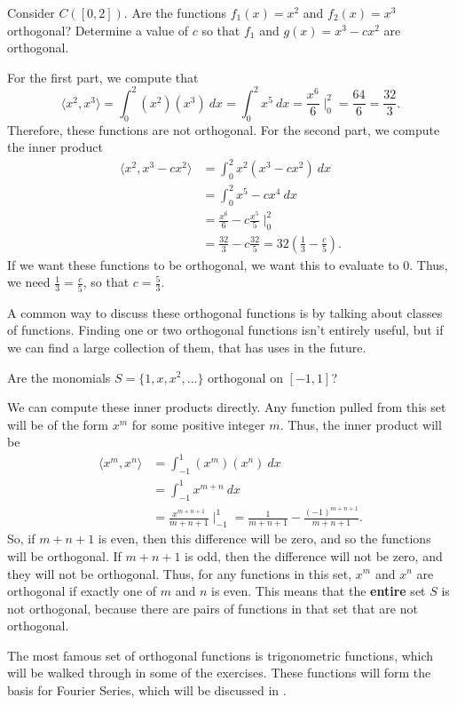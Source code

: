 \documentclass{ximera}
\begin{document}
\begin{example}
    Consider $C([0,2])$. Are the functions $f_1(x) = x^2$ and $f_2(x) = x^3$ orthogonal? Determine a value of $c$ so that $f_1$ and $g(x) = x^3 - cx^2$ are orthogonal.
\end{example}

\begin{exampleSol}
    For the first part, we compute that
    \[ 
        \langle x^2, x^3 \rangle = \int_0^2 (x^2)(x^3)\ dx = \int_0^2 x^5\ dx = \frac{x^6}{6}\mid_0^2 = \frac{64}{6} = \frac{32}{3}. 
    \] 
    Therefore, these functions are not orthogonal. For the second part, we compute the inner product
    \[ 
        \begin{split}
            \langle x^2, x^3 - cx^2 \rangle &= \int_0^2 x^2(x^3 - cx^2)\ dx \\
            &= \int_0^2 x^5 - cx^4\ dx \\
            &= \frac{x^6}{6} - c\frac{x^5}{5} \mid_0^2 \\
            &= \frac{32}{3} - c\frac{32}{5} = 32\left(\frac{1}{3} - \frac{c}{5} \right).
        \end{split} 
    \]
    If we want these functions to be orthogonal, we want this to evaluate to $0$. Thus, we need $\frac{1}{3} = \frac{c}{5}$, so that $c = \frac{5}{3}$. 
\end{exampleSol}

A common way to discuss these orthogonal functions is by talking about classes of functions. Finding one or two orthogonal functions isn't entirely useful, but if we can find a large collection of them, that has uses in the future.

\begin{example}
    Are the monomials $S = \{1, x, x^2, ...\}$ orthogonal on $[-1,1]$?
\end{example}

\begin{exampleSol}
    We can compute these inner products directly. Any function pulled from this set will be of the form $x^m$ for some positive integer $m$. Thus, the inner product will be
    \[ 
        \begin{split}
            \langle x^m, x^n \rangle &= \int_{-1}^1 (x^m)(x^n)\ dx \\
            &= \int_{-1}^1 x^{m+n}\ dx \\
            &= \frac{x^{m+n+1}}{m+n+1}\mid_{-1}^1 = \frac{1}{m+n+1} - \frac{(-1)^{m+n+1}}{m+n+1}.
        \end{split} 
    \]
    So, if $m+n+1$ is even, then this difference will be zero, and so the functions will be orthogonal. If $m+n+1$ is odd, then the difference will not be zero, and they will not be orthogonal. Thus, for any functions in this set, $x^m$ and $x^n$ are orthogonal if exactly one of $m$ and $n$ is even. This means that the \textbf{entire} set $S$ is not orthogonal, because there are pairs of functions in that set that are not orthogonal.
\end{exampleSol}

The most famous set of orthogonal functions is trigonometric functions, which will be walked through in some of the exercises. These functions will form the basis for Fourier Series, which will be discussed in . 
\end{document}
